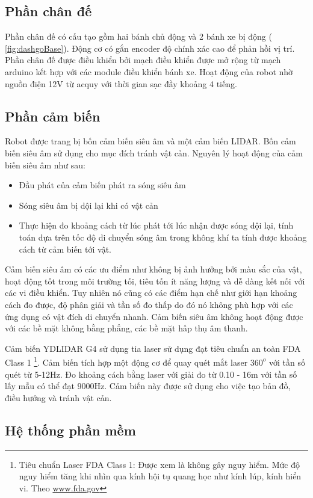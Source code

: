 \subsection{Phần chân đế}
Phần chân đế có cấu tạo gồm hai bánh chủ động và 2 bánh xe bị động (\figurename{ \ref{fig:dashgoBase}}). Động cơ có gắn encoder độ chính xác cao để phản hồi vị trí. Phần chân đế được điều khiển bởi mạch điều khiển được mở rộng từ mạch arduino kết hợp với các module điều khiển bánh xe. Hoạt động của robot nhờ nguồn điện 12V từ acquy với thời gian sạc đầy khoảng 4 tiếng.

\subsection{Phần cảm biến}
Robot được trang bị bốn cảm biến siêu âm và một cảm biến LIDAR. Bốn cảm biến siêu âm sử dụng cho mục đích tránh vật cản. Nguyên lý hoạt động của cảm biến siêu âm như sau:
\begin{itemize}
    \item Đầu phát của cảm biến phát ra sóng siêu âm
    \item Sóng siêu âm bị dội lại khi có vật cản
    \item Thực hiện đo khoảng cách từ lúc phát tới lúc nhận được sóng dội lại, tính toán dựa trên tốc độ di chuyển sóng âm trong không khí ta tính được khoảng cách từ cảm biến tới vật.
\end{itemize}
Cảm biến siêu âm có các ưu điểm như không bị ảnh hưởng bởi màu sắc của vật, hoạt động tốt trong môi trường tối, tiêu tốn ít năng lượng và dễ dàng kết nối với các vi điều khiển. Tuy nhiên nó cũng có các điểm hạn chế như giới hạn khoảng cách đo được, độ phân giải và tần số đo thấp do đó nó không phù hợp với các ứng dụng có vật đích di chuyển nhanh. Cảm biến siêu âm không hoạt động được với các bề mặt không bằng phẳng, các bề mặt hấp thụ âm thanh.

Cảm biến YDLIDAR G4 sử dụng tia laser sử dụng đạt tiêu chuẩn an toàn FDA Class 1 \footnote{Tiêu chuẩn Laser FDA Class 1: Được xem là không gây nguy hiểm. Mức độ nguy hiểm tăng khi nhìn qua kính hội tụ quang học như kính lúp, kính hiển vi. Theo \url{www.fda.gov}}.
Cảm biến tích hợp một động cơ để quay quét mắt laser ${360}^{o}$ với tần số quét từ 5-12Hz. Đo khoảng cách bằng laser với giải đo từ 0.10 - 16m với tần số lấy mẫu có thể đạt 9000Hz.
Cảm biến này được sử dụng cho việc tạo bản đồ, điều hướng và tránh vật cản.


\subsection{Hệ thống phần mềm}

